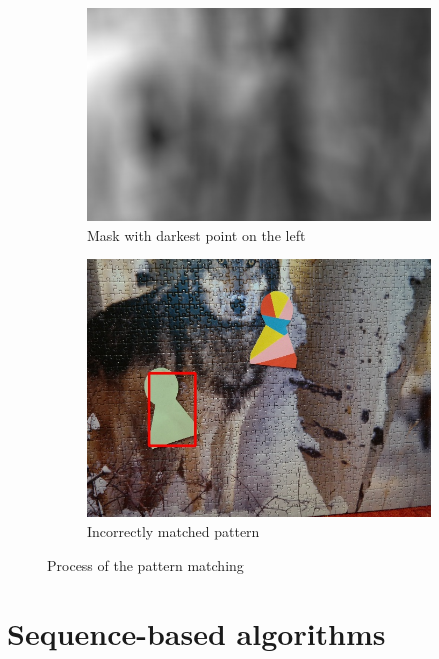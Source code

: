\begin{figure}
\begin{subfigure}[t]{0.48\linewidth}
    \includegraphics[width=\linewidth]{img/pattern_matching/mask-incorrect.jpg}
    \vspace{4mm}%
    \caption{Mask with darkest point on the left}
  \end{subfigure}
  \begin{subfigure}[t]{0.48\linewidth}
    \includegraphics[width=\linewidth]{img/pattern_matching/result-incorrect.jpg}
    \caption{Incorrectly matched pattern}
  \end{subfigure}
  \caption{Process of the pattern matching}
  \label{fig:pattern-matching-tracker}
\end{figure}


\section{Sequence-based algorithms}

